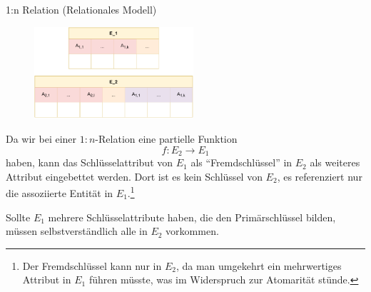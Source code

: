 \begin{defi}{1:n Relation (Relationales Modell)}
    \begin{figure}
        \begin{center}
            \includegraphics[width=0.525\textwidth]{includes/figures/definition_relational_modell_relation_one_to_many.pdf}
        \end{center}
    \end{figure}
    Da wir bei einer $1:n$-Relation eine partielle Funktion
    \[
        f: E_2 \to E_1
    \]
    haben, kann das Schlüsselattribut von $E_1$ als \enquote{Fremdschlüssel} in $E_2$ als weiteres Attribut eingebettet werden.
    Dort ist es kein Schlüssel von $E_2$, es referenziert nur die assoziierte Entität in $E_1$.\footnote{Der Fremdschlüssel kann nur in $E_2$, da man umgekehrt ein mehrwertiges Attribut in $E_1$ führen müsste, was im Widerspruch zur Atomarität stünde.}

    Sollte $E_1$ mehrere Schlüsselattribute haben, die den Primärschlüssel bilden, müssen selbstverständlich alle in $E_2$ vorkommen.
\end{defi}

